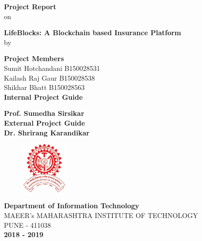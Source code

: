 \vspace{0.4in}
\begin{center}
{\bf Project Report} \\
{on}
\end {center} 
\begin{center}
{\Large \bf LifeBlocks: A Blockchain based Insurance Platform	} \\
{by}
\vspace{0.2in}

{\bf Project Members} \\ 
\vspace{0.2in}
{ Sumit Hotchandani B150028531}\\
{ Kailash Raj Gaur B150028538}\\ 
{ Shikhar Bhatt B150028563}\\ 
\vspace{0.4in}
{\bf Internal Project Guide}\\
\vspace{0.1in}
{\large {\bf Prof. Sumedha Sirsikar}\\
\vspace{0.3in}
{\bf External Project Guide}\\
\vspace{0.1in}
{\large {\bf Dr. Shrirang Karandikar}}\\
\vspace{0.5in}
\begin{figure}[h]
	\centering
		\includegraphics[width=0.20\textwidth]{Images/MIT_Logo.jpg}
	\label{fig:mit}
\end{figure}

{\bf Department of Information Technology} \\
{\large MAEER's MAHARASHTRA INSTITUTE OF TECHNOLOGY}\\
{PUNE - 411038}\\
{\bf 2018 - 2019}}
\end{center}
